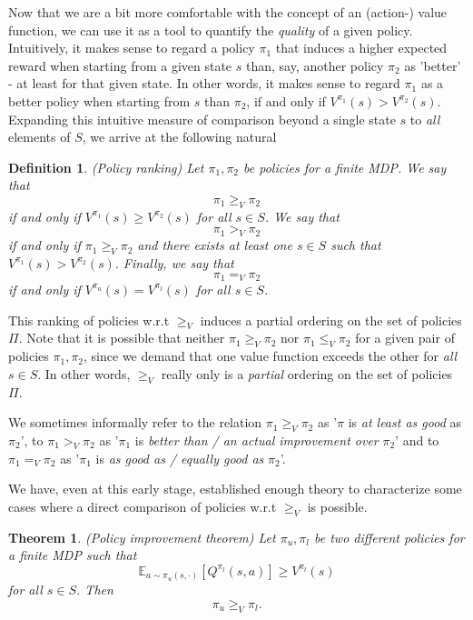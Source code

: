 \documentclass[11pt]{article} %
\newtheorem{thm}{Theorem}
\newtheorem{defn}{Definition}
\begin{document}
Now that we are a bit more comfortable with the concept of an (action-) value function, we can use it as a tool to quantify the \textit{quality} of a given policy. Intuitively, it makes sense to regard a policy $\pi_1$ that induces a higher expected reward when starting from a given state $s$ than, say, another policy $\pi_2$ as 'better'  - at least for that given state. In other words, it makes sense to regard $\pi_1$ as a better policy when starting from $s$ than $\pi_2$, if and only if $V^{\pi_1}(s) > V^{\pi_2}(s)$. Expanding this intuitive measure of comparison beyond a single state $s$ to \textit{all} elements of $S$, we arrive at the following natural

\begin{defn}{(Policy ranking)}
Let $\pi_1, \pi_2$ be policies for a finite MDP. We say that $$\pi_1 \ge_V \pi_2$$ if and only if $V^{\pi_1}(s) \ge V^{\pi_2}(s)$ for all $s \in S$. We say that $$\pi_1 >_V \pi_2$$ if and only if  $\pi_1 \ge_V \pi_2$ and there exists at least one $s \in S$ such that $V^{\pi_1}(s) > V^{\pi_2}(s).$ Finally, we say that $$\pi_1 =_V \pi_2$$ if and only if $V^{\pi_u}(s) = V^{\pi_l}(s)$ for all $s \in S$.
\end{defn}

This ranking of policies w.r.t $\ge_V$ induces a partial ordering on the set of policies $\Pi$. Note that it is possible that neither $\pi_1 \ge_V \pi_2$ nor $\pi_1 \le_V \pi_2$ for a given pair of policies $\pi_1,\pi_2$, since we demand that one value function exceeds the other for \textit{all} $s \in S$. In other words, $\ge_V$ really only is a \textit{partial} ordering on the set of policies $\Pi$.

We sometimes informally refer to the relation $\pi_1 \ge_V \pi_2$ as '$\pi$ is \textit{at least as good} as $\pi_2$', to $\pi_1 >_V \pi_2$ as '$\pi_1$ is \textit{better than / an actual improvement over} $\pi_2$' and to $\pi_1 =_V \pi_2$ as '$\pi_1$ is \textit{as good as / equally good as} $\pi_2$'.

We have, even at this early stage, established enough theory to characterize some cases where a direct comparison of policies w.r.t $\ge_V$ is possible.

\begin{thm}{(Policy improvement theorem)}
	Let $\pi_u, \pi_l$ be two different policies for a finite MDP such that $$ \mathbb{E}_{a \sim \pi_u(s,\cdot )}[Q^{\pi_l}(s,a)] \ge V^{\pi_l}(s)$$ for all $s \in S$. Then $$\pi_u \ge_V \pi_l.$$
\end{thm}
\end{document}
